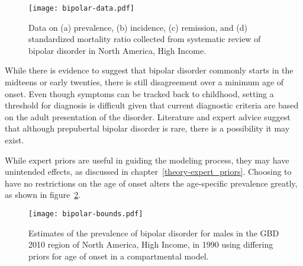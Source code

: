     \begin{figure}[h]
        \begin{center}
            \texttt{[image: bipolar-data.pdf]}
            \caption[Systematic review data for bipolar disorder.]{Data on
            (a) prevalence, (b) incidence, (c) remission, and
              (d) standardized mortality ratio collected from systematic review
              of bipolar disorder in
              North America, High Income.}
            \label{fig:app-bipolar data}
        \end{center}
    \end{figure}

While there is evidence to suggest that bipolar disorder commonly
starts in the midteens or early twenties, there is still disagreement
over a minimum age of onset.  Even though symptoms can be tracked back
to childhood, setting a threshold for diagnosis is difficult given
that current diagnostic criteria are based on the adult presentation of
the disorder.  Literature and expert advice suggest that although
prepubertal bipolar disorder is rare, there is a possibility it may
exist. \cite{kloos_bipolar_2011, angst_historical_2000}

While expert priors are useful in guiding the modeling process, they
may have unintended effects, as discussed in chapter~\ref{theory-expert_priors}.
Choosing to have no restrictions on the
age of onset alters the age-specific prevalence greatly, as shown in
figure~\ref{fig:app-bipolar bounds}.

    \begin{figure}[h]
        \begin{center}
            \texttt{[image: bipolar-bounds.pdf]}
            \caption[Comparison of prevalence estimates for bipolar disorder
              using differing priors for the age of onset in a compartmental
              modle.]{Estimates of the prevalence of bipolar disorder
              for males in the GBD 2010 region of North America, High Income,
              in 1990 using differing priors for age of onset
              in a compartmental model.}
            \label{fig:app-bipolar bounds}
        \end{center}
    \end{figure}

